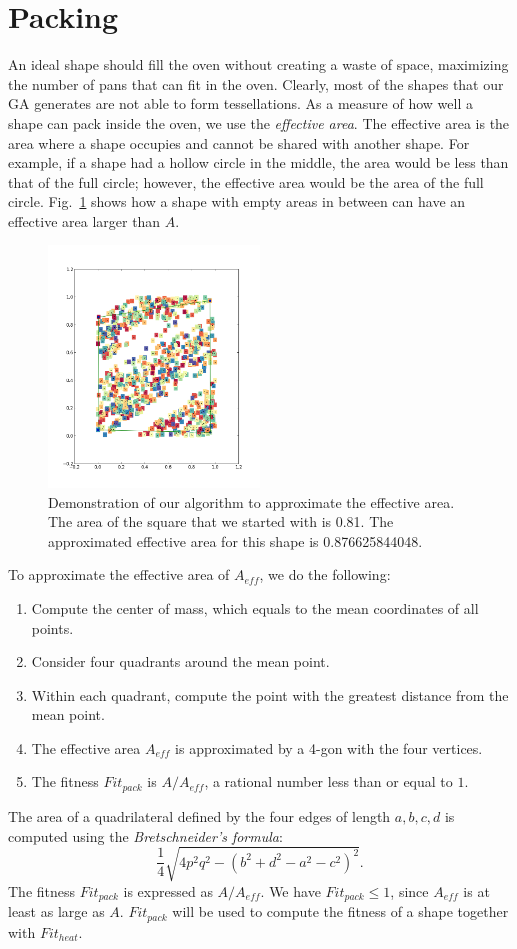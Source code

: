 \documentclass[12pt,draft]{reedmcm}
\begin{document}
\section{Packing}
\label{sec:packing}
An ideal shape should fill the oven without creating a waste of space, maximizing the number of pans that can fit in the oven.
Clearly, most of the shapes that our GA generates are not able to form tessellations.
As a measure of how well a shape can pack inside the oven, we use the \textit{effective area}.
The effective area is the area where a shape occupies and cannot be shared with another shape.
For example, if a shape had a hollow circle in the middle, the area would be less than that of the full circle; however, the effective area would be the area of the full circle.
Fig.~\ref{fig:effarea} shows how a shape with empty areas in between can have an effective area larger than $A$.
\begin{figure}[h!]
  \centering
  \includegraphics[width=0.5\textwidth]{area_approx}
  \caption{Demonstration of our algorithm to approximate the effective area.
  The area of the square that we started with is 0.81.
  The approximated effective area for this shape is 0.876625844048.}
  \label{fig:effarea}
\end{figure}
%
To approximate the effective area of $A_{eff}$, we do the following:
\begin{enumerate}
  \item Compute the center of mass, which equals to the mean coordinates of all points.
  \item Consider four quadrants around the mean point.
  \item Within each quadrant, compute the point with the greatest distance from the mean point.
  \item The effective area $A_{eff}$ is approximated by a 4-gon with the four vertices.
  \item The fitness $Fit_{pack}$ is $A/A_{eff}$, a rational number less than or equal to $1$.
\end{enumerate}
The area of a quadrilateral defined by the four edges of length $a,b,c,d$ is computed using the \textit{Bretschneider's formula}:
\begin{equation*}
  \frac{1}{4}\sqrt{4p^2 q^2 - (b^2 + d^2 - a^2 - c^2)^2}.
\end{equation*}
The fitness $Fit_{pack}$ is expressed as $A/A_{eff}$.
We have $Fit_{pack} \leq 1$, since $A_{eff}$ is at least as large as $A$.
$Fit_{pack}$ will be used to compute the fitness of a shape together with $Fit_{heat}$.
\end{document}
